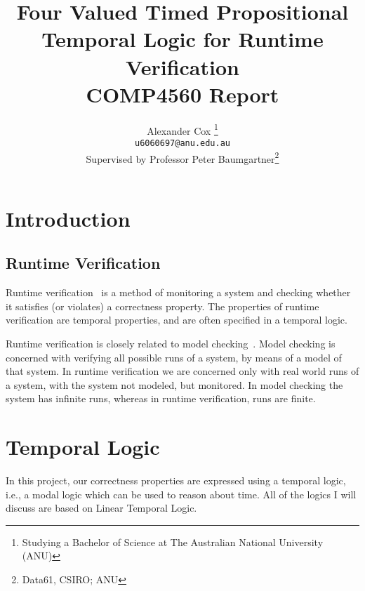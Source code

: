 \documentclass[a4paper]{article}
\title{
  Four Valued Timed Propositional Temporal Logic for Runtime Verification\\
  \normalsize{} COMP4560 Report
}
\author{
  Alexander Cox
  \thanks{Studying a Bachelor of Science at The Australian National University (ANU)}\\
  \small\texttt{u6060697@anu.edu.au}\\
  \normalsize{}Supervised by Professor Peter Baumgartner\thanks{Data61, CSIRO\@; ANU}
}
\begin{document}
\maketitle

\begin{abstract}
\end{abstract}
\newpage
\tableofcontents
\newpage

\section{Introduction}
\subsection{Runtime Verification}
Runtime verification~\autocite{colin2005rv} is a method of monitoring a system and checking whether it satisfies (or violates) a correctness property.
The properties of runtime verification are temporal properties, and are often specified in a temporal logic. %

Runtime verification is closely related to model checking~\autocite{baier2008principles}. Model checking is concerned with verifying all possible runs of a system, by means of a model of that system. In runtime verification we are concerned only with real world runs of a system, with the system not modeled, but monitored. In model checking the system has infinite runs, whereas in runtime verification, runs are finite.


\section{Temporal Logic}
In this project, our correctness properties are expressed using a temporal logic, i.e., a modal logic which can be used to reason about time. All of the logics I will discuss are based on Linear Temporal Logic.

\end{document}

